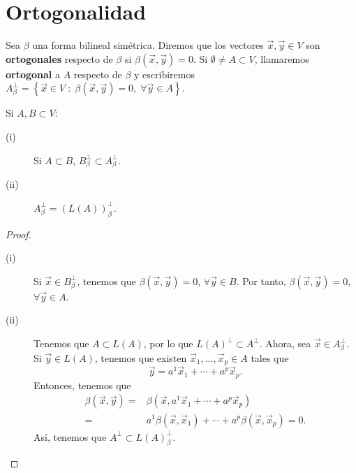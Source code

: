 \section{Ortogonalidad}
\begin{fdefinition}[Ortogonal]
\normalfont Sea $\displaystyle \beta  $ una forma bilineal simétrica. Diremos que los vectores $\displaystyle \vec{x}, \vec{y} \in V $ son \textbf{ortogonales} respecto de $\displaystyle \beta  $ si $\displaystyle \beta\left(\vec{x}, \vec{y}\right) = 0 $. Si $\displaystyle \emptyset \neq A \subset V $, llamaremos \textbf{ortogonal} a $\displaystyle A $ respecto de $\displaystyle \beta  $ y escribiremos $\displaystyle A^{\perp }_{\beta } = \left\{ \vec{x} \in V \; : \; \beta\left(\vec{x}, \vec{y}\right) = 0, \; \forall \vec{y} \in A\right\}  $.
\end{fdefinition}
\begin{fprop}[]
\normalfont Si $\displaystyle A, B \subset V $:
\begin{description}
\item[(i)] Si $\displaystyle A \subset B $, $\displaystyle B_{\beta }^{\perp } \subset A^{\perp }_{\beta } $.
\item[(ii)] $\displaystyle A^{\perp }_{\beta } = \left(L\left(A\right)\right)^{\perp }_{\beta } $.
\end{description}
\end{fprop}
\begin{proof}
\begin{description}
\item[(i)] Si $\displaystyle \vec{x} \in B^{\perp }_{\beta} $, tenemos que $\displaystyle \beta\left(\vec{x}, \vec{y}\right) = 0 $, $\displaystyle \forall \vec{y}\in B $. Por tanto, $\displaystyle \beta\left(\vec{x}, \vec{y}\right) = 0 $, $\displaystyle \forall \vec{y} \in A $.
\item[(ii)] Tenemos que $\displaystyle A \subset L\left(A\right) $, por lo que $\displaystyle L\left(A\right)^{\perp } \subset A^{\perp } $. Ahora, sea $\displaystyle \vec{x} \in A^{\perp }_{\beta } $. Si $\displaystyle \vec{y} \in L\left(A\right) $, tenemos que existen $\displaystyle \vec{x}_{1}, \ldots, \vec{x}_{p} \in A $ tales que
	\[\vec{y} = a^{1}\vec{x}_{1} + \cdots + a^{p}\vec{x}_{p} .\]
Entonces, tenemos que 
\[
\begin{split}
	\beta\left(\vec{x}, \vec{y}\right) = & \beta\left(\vec{x}, a^{1}\vec{x}_{1} + \cdots + a^{p}\vec{x}_{p}\right)  \\
	= & a^{1}\beta\left(\vec{x}, \vec{x}_{1}\right) + \cdots + a^{p}\beta\left(\vec{x}, \vec{x}_{p}\right) = 0.
\end{split}
\]
Así, tenemos que $\displaystyle A^{\perp } \subset L\left(A\right)^{\perp }_{\beta } $.
\end{description}
\end{proof}

